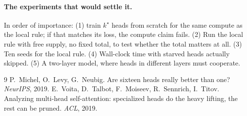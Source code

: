 \documentclass[11pt]{report}
\newcommand{\kstar}{k^\star}
\begin{document}
\paragraph{The experiments that would settle it.} In order of importance: (1) train
$\kstar$ heads from scratch for the same compute as the local rule; if that matches its
loss, the compute claim fails. (2) Run the local rule with free supply, no fixed total,
to test whether the total matters at all. (3) Ten seeds for the local rule. (4) Wall-clock
time with starved heads actually skipped. (5) A two-layer model, where heads in different
layers must cooperate.

\begin{thebibliography}{9}
 P.~Michel, O.~Levy, G.~Neubig.
  Are sixteen heads really better than one? \emph{NeurIPS}, 2019.
 E.~Voita, D.~Talbot, F.~Moiseev, R.~Sennrich, I.~Titov.
  Analyzing multi-head self-attention: specialized heads do the heavy lifting, the rest
  can be pruned. \emph{ACL}, 2019.
\end{thebibliography}
\end{document}
